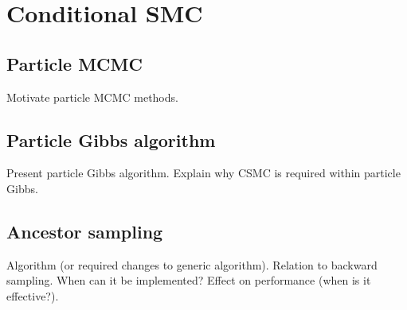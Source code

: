 \section{Conditional SMC}

\subsection{Particle MCMC}
Motivate particle MCMC methods. 

\subsection{Particle Gibbs algorithm}
Present particle Gibbs algorithm. Explain why CSMC is required within particle Gibbs.

\subsection{Ancestor sampling}
Algorithm (or required changes to generic algorithm). Relation to backward sampling. When can it be implemented? Effect on performance (when is it effective?).
